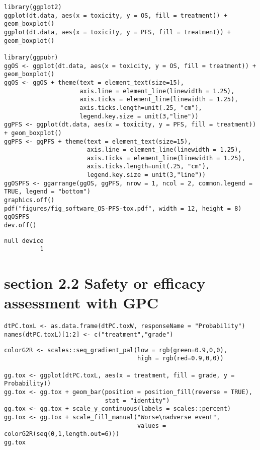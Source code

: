 \documentclass[12pt]{article}
\begin{document}
\lstset{language=r,label= ,caption= ,captionpos=b,numbers=none}
\begin{lstlisting}
library(ggplot2)
ggplot(dt.data, aes(x = toxicity, y = OS, fill = treatment)) + geom_boxplot()
ggplot(dt.data, aes(x = toxicity, y = PFS, fill = treatment)) + geom_boxplot()

library(ggpubr)
ggOS <- ggplot(dt.data, aes(x = toxicity, y = OS, fill = treatment)) + geom_boxplot()
ggOS <- ggOS + theme(text = element_text(size=15), 
                     axis.line = element_line(linewidth = 1.25),
                     axis.ticks = element_line(linewidth = 1.25),
                     axis.ticks.length=unit(.25, "cm"),
                     legend.key.size = unit(3,"line"))
ggPFS <- ggplot(dt.data, aes(x = toxicity, y = PFS, fill = treatment)) + geom_boxplot()
ggPFS <- ggPFS + theme(text = element_text(size=15), 
                       axis.line = element_line(linewidth = 1.25),
                       axis.ticks = element_line(linewidth = 1.25),
                       axis.ticks.length=unit(.25, "cm"),
                       legend.key.size = unit(3,"line"))
ggOSPFS <- ggarrange(ggOS, ggPFS, nrow = 1, ncol = 2, common.legend = TRUE, legend = "bottom")
graphics.off()
pdf("figures/fig_software_OS-PFS-tox.pdf", width = 12, height = 8)
ggOSPFS
dev.off()
\end{lstlisting}

\begin{verbatim}
null device 
          1
\end{verbatim}
\section{section 2.2 Safety or efficacy assessment with GPC}
\label{sec:org7e2d6e6}

\lstset{language=r,label= ,caption= ,captionpos=b,numbers=none}
\begin{lstlisting}
dtPC.toxL <- as.data.frame(dtPC.toxW, responseName = "Probability")
names(dtPC.toxL)[1:2] <- c("treatment","grade")
\end{lstlisting}

\lstset{language=r,label= ,caption= ,captionpos=b,numbers=none}
\begin{lstlisting}
colorG2R <- scales::seq_gradient_pal(low = rgb(green=0.9,0,0),
                                     high = rgb(red=0.9,0,0))

gg.tox <- ggplot(dtPC.toxL, aes(x = treatment, fill = grade, y = Probability))
gg.tox <- gg.tox + geom_bar(position = position_fill(reverse = TRUE),
                            stat = "identity")
gg.tox <- gg.tox + scale_y_continuous(labels = scales::percent)
gg.tox <- gg.tox + scale_fill_manual("Worse\nadverse event",
                                     values = colorG2R(seq(0,1,length.out=6)))
gg.tox 
\end{lstlisting}
\end{document}
